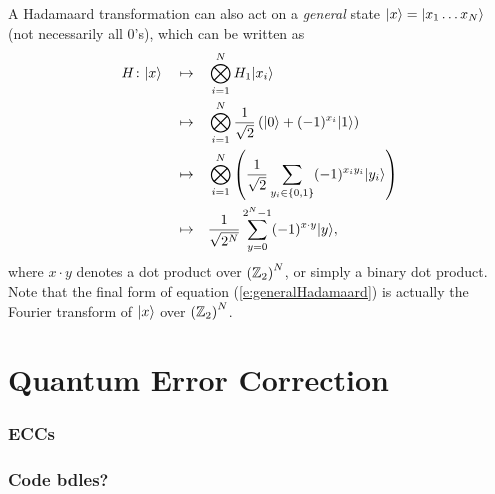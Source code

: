 A Hadamaard transformation can also act on a {\sl general} state 
${|{x}\rangle}={|{x_1\ldots x_N}\rangle}$
(not necessarily all 0's), which can be written as
\begin{equation}
\begin{split}
H\colon{|{x}\rangle}\quad\mapsto\quad&
\bigotimes_{i=1}^N 
H_1{|{x_i}\rangle}\\
\quad\mapsto\quad&
\bigotimes_{i=1}^N 
\frac{1}{\sqrt{2}} \left( {|{0}\rangle} + (-1)^{x_i}{|{1}\rangle} \right)\\
\quad\mapsto\quad&
\bigotimes_{i=1}^N 
\left(\frac{1}{\sqrt{2}} \sum_{y_i\in\lbrace 0,1\rbrace} 
(-1)^{x_iy_i}{|{y_i}\rangle}\right)\\
\quad\mapsto\quad&
\frac{1}{\sqrt{2^N}} \sum_{y=0}^{2^N-1} (-1)^{x\cdot y}{|{y}\rangle},
\end{split}
\label{e:generalHadamaard}
\end{equation}
where $x\cdot y$ denotes a dot product over $\left({\mathbb{Z}}_2\right)^N$, or
simply a binary dot product.  Note that the final form of equation
(\ref{e:generalHadamaard}) is actually the Fourier transform of ${|{x}\rangle}$
over $\left({\mathbb{Z}}_2\right)^N$.



%

%

\section{Quantum Error Correction}

\subsubsection{ECCs}
\subsubsection{Code bdles?}

